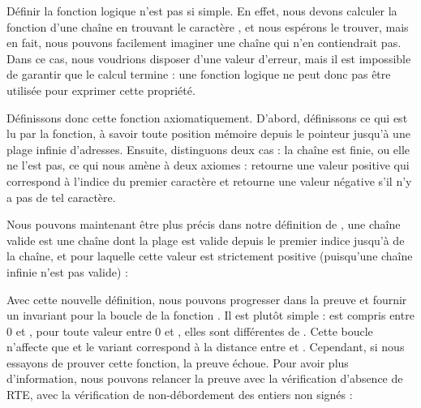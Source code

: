 


Définir la fonction logique  n'est pas si simple. En effet,
nous devons calculer la fonction d'une chaîne en trouvant le caractère
, et nous espérons le trouver, mais en fait,
nous pouvons facilement imaginer une chaîne qui n'en contiendrait pas. Dans
ce cas, nous voudrions disposer d'une valeur d'erreur, mais il est impossible de
garantir que le calcul termine : une fonction logique ne peut donc pas être
utilisée pour exprimer cette propriété.



Définissons donc cette fonction axiomatiquement. D'abord, définissons ce qui
est lu par la fonction, à savoir toute position mémoire depuis le pointeur
jusqu'à une plage infinie d'adresses. Ensuite, distinguons deux cas : la chaîne
est finie, ou elle ne l'est pas, ce qui nous amène à deux axiomes :
 retourne une valeur positive qui correspond à l'indice
du premier caractère  et retourne une valeur
négative s'il n'y a pas de tel caractère.






Nous pouvons maintenant être plus précis dans notre définition de
, une chaîne valide est une
chaîne dont la plage est valide depuis le premier indice jusqu'à
 de la chaîne, et pour laquelle cette valeur est strictement
positive (puisqu'une chaîne infinie n'est pas valide) :




Avec cette nouvelle définition, nous pouvons progresser dans la preuve et fournir
un invariant pour la boucle de la fonction . Il est plutôt
simple :  est compris entre 0 et , pour
toute valeur entre 0 et , elles sont différentes de
. Cette boucle n'affecte que 
et le variant correspond à la distance entre  et
. Cependant, si nous essayons de prouver cette fonction,
la preuve échoue. Pour avoir plus d'information, nous pouvons relancer la
preuve avec la vérification d'absence de RTE, avec la vérification de
non-débordement des entiers non signés :



